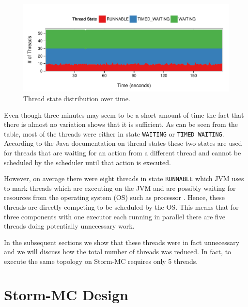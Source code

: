 \documentclass[bsc,deptreport,twoside,singlespacing,normalheadings,parskip]{infthesis}\usepackage[]{graphicx}\usepackage[]{color}
\makeatletter
\def\maxwidth{ %
  \ifdim\Gin@nat@width>\linewidth
    \linewidth
  \else
    \Gin@nat@width
  \fi
}
\newenvironment{knitrout}{}{} %
\makeatother
\begin{document}
\begin{knitrout}
\color{fgcolor}\begin{figure}[!htb]
\includegraphics[width=\maxwidth]{figure/dump-plot-1} \caption[Thread state distribution over time]{Thread state distribution over time.}\label{fig:dump-plot}
\end{figure}


\end{knitrout}

Even though three minutes may seem to be a short amount of time the fact that there is almost no variation shows that it is sufficient. As can be seen from the table, most of the threads were either in state \texttt{WAITING} or \texttt{TIMED WAITING}. According to the Java documentation on thread states \citep{JavaThreads} these two states are used for threads that are waiting for an action from a different thread and cannot be scheduled by the scheduler until that action is executed.

However, on average there were eight threads in state \texttt{RUNNABLE} which JVM uses to mark threads which are executing on the JVM and are possibly waiting for resources from the operating system (OS) such as processor \citep{JavaThreads}. Hence, these threads are directly competing to be scheduled by the OS. This means that for three components with one executor each running in parallel there are five threads doing potentially unnecessary work.

In the subsequent sections we show that these threads were in fact unnecessary and we will discuss how the total number of threads was reduced. In fact, to execute the same topology on Storm-MC requires only 5 threads.

\section{Storm-MC Design}
\label{sec:storm_mc_arch}
\end{document}
